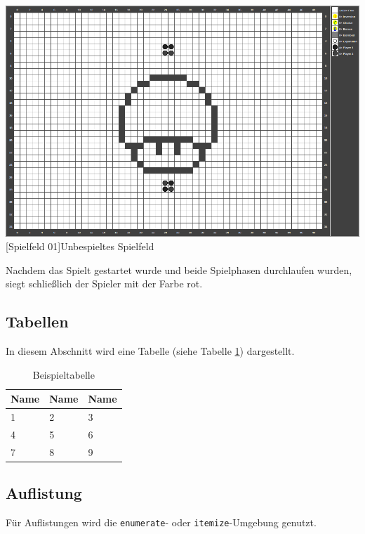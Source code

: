 \vspace{1em}
\begin{minipage}{\linewidth}
	\centering
	\includegraphics[width=0.5\linewidth]{pics/gamefield01.png}
	[Spielfeld 01]{Unbespieltes Spielfeld\footnotemark }
	\label{fig:reversi01}
\end{minipage}

Nachdem das Spielt gestartet wurde und beide Spielphasen durchlaufen wurden, siegt schließlich der Spieler mit der Farbe rot.


\subsection{Tabellen}
In diesem Abschnitt wird eine Tabelle (siehe Tabelle \ref{tab:beispiel}) dargestellt.

\vspace{1em}
\begin{table}[!h]
	\centering
	\begin{tabular}{|l|l|l|}
		\hline
		\textbf{Name} & \textbf{Name} & \textbf{Name}\\
		\hline
		1 & 2 & 3\\
		\hline
		4 & 5 & 6\\
		\hline
		7 & 8 & 9\\
		\hline
	\end{tabular}
	\caption{Beispieltabelle}
	\label{tab:beispiel}
\end{table}


\subsection{Auflistung}
Für Auflistungen wird die \texttt{enumerate}- oder \texttt{itemize}-Umgebung genutzt.

